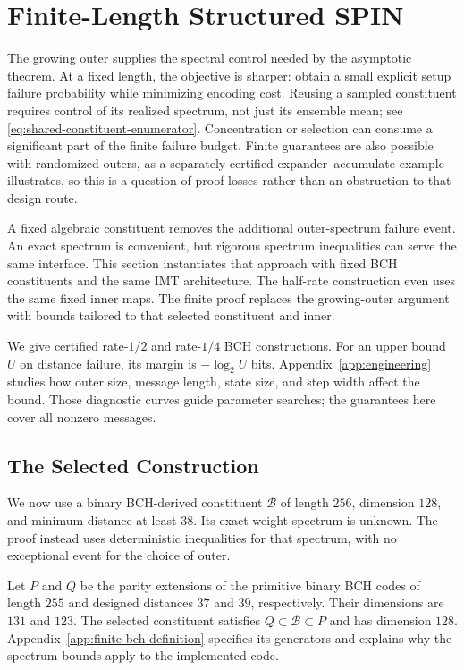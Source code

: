\section{Finite-Length Structured SPIN}
\label{sec:finite-certificates}

The growing outer supplies the spectral control needed by the asymptotic
theorem. At a fixed length, the objective is sharper: obtain a small explicit
setup failure probability while minimizing encoding cost.
Reusing a sampled constituent requires control of its realized spectrum,
not just its ensemble mean; see \eqref{eq:shared-constituent-enumerator}.
Concentration or selection can consume a significant part of the finite
failure budget. Finite guarantees are also possible with randomized outers,
as a separately certified expander--accumulate example illustrates, so this is a question of
proof losses rather than an obstruction to that design route.

A fixed algebraic constituent removes the additional outer-spectrum failure
event. An exact spectrum is convenient, but rigorous spectrum inequalities
can serve the same interface. This section instantiates that approach
with fixed BCH constituents and the same IMT architecture. The half-rate
construction even uses the same fixed inner maps.
The finite proof replaces the growing-outer argument with bounds tailored
to that selected constituent and inner.

We give certified rate-$1/2$ and rate-$1/4$ BCH constructions.
For an upper bound $U$ on distance failure, its margin is $-\log_2U$ bits.
Appendix~\ref{app:engineering} studies how outer size, message length,
state size, and step width affect the bound. Those diagnostic curves guide
parameter searches; the guarantees here cover all nonzero messages.

\subsection{The Selected Construction}
\label{sec:finite-selected-construction}

We now use a binary BCH-derived constituent $\mathcal B$ of length $256$,
dimension $128$, and minimum distance at least $38$.
Its exact weight spectrum is unknown. The proof instead uses deterministic
inequalities for that spectrum, with no exceptional event for the choice
of outer.

Let $P$ and $Q$ be the parity extensions of the primitive binary BCH codes
of length $255$ and designed distances $37$ and $39$, respectively.
Their dimensions are $131$ and $123$. The selected constituent satisfies
$Q\subset\mathcal B\subset P$ and has dimension $128$.
Appendix~\ref{app:finite-bch-definition} specifies its generators and explains
why the spectrum bounds apply to the implemented code.

